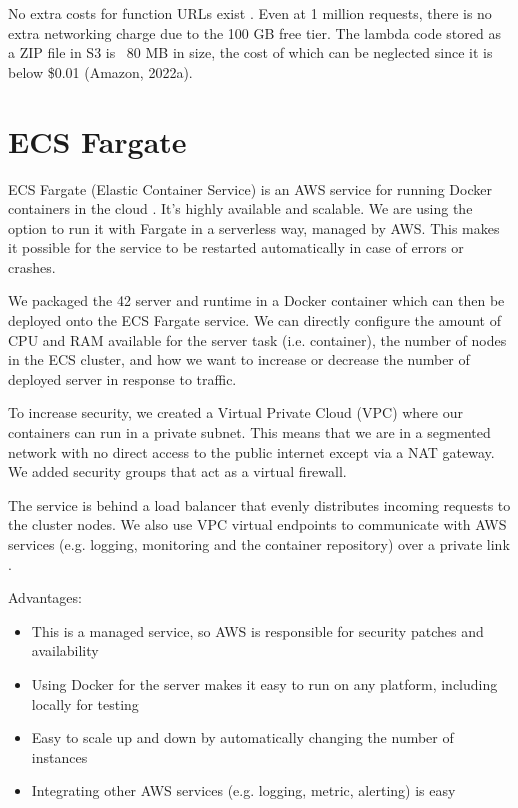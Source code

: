 No extra costs for function URLs exist \cite{casalboni-2022}. Even at 1 million requests, there is no extra networking charge due to the 100 GB free tier. The lambda code stored as a ZIP file in S3 is ~80 MB in size, the cost of which can be neglected since it is below \$0.01 (Amazon, 2022a).

\section{ECS Fargate}

ECS Fargate (Elastic Container Service) is an AWS service for running Docker containers in the cloud \cite{amazon-2022E}. It's highly available and scalable. We are using the option to run it with Fargate in a serverless way, managed by AWS. This makes it possible for the service to be restarted automatically in case of errors or crashes.

We packaged the 42 server and runtime in a Docker container which can then be deployed onto the ECS Fargate service. We can directly configure the amount of CPU and RAM available for the server task (i.e. container), the number of nodes in the ECS cluster, and how we want to increase or decrease the number of deployed server in response to traffic.

To increase security, we created a Virtual Private Cloud (VPC) where our containers can run in a private subnet. This means that we are in a segmented network with no direct access to the public internet except via a NAT gateway. We added security groups that act as a virtual firewall.

The service is behind a load balancer that evenly distributes incoming requests to the cluster nodes. We also use VPC virtual endpoints to communicate with AWS services (e.g. logging, monitoring and the container repository) over a private link \cite{amazon-2022F}.


Advantages:
\begin{itemize}
\item This is a managed service, so AWS is responsible for security patches and availability
\item Using Docker for the server makes it easy to run on any platform, including locally for testing
\item Easy to scale up and down by automatically changing the number of instances
\item Integrating other AWS services (e.g. logging, metric, alerting) is easy
\end{itemize}

